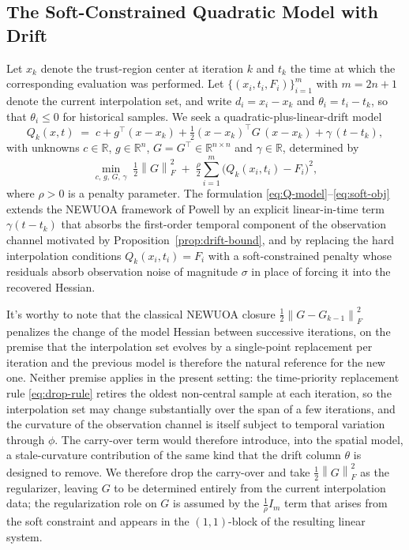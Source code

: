 \documentclass[11pt,a4paper]{article}
\newcommand{\R}{\mathbb{R}}
\newcommand{\norm}[1]{\left\| #1 \right\|}
\begin{document}
\subsection{The Soft-Constrained Quadratic Model with Drift}
\label{sec:kkt-derivation}

Let $x_k$ denote the trust-region center at iteration $k$ and $t_k$
the time at which the corresponding evaluation was performed. Let
$\{(x_i, t_i, F_i)\}_{i=1}^m$ with $m = 2n+1$ denote the current
interpolation set, and write $d_i = x_i - x_k$ and
$\theta_i = t_i - t_k$, so that $\theta_i \le 0$ for historical
samples. We seek a quadratic-plus-linear-drift model
\begin{equation}\label{eq:Q-model}
  Q_k(x,t) \;=\; c + g^{\!\top}(x - x_k) +
  \tfrac{1}{2}(x - x_k)^{\!\top}G\,(x - x_k) + \gamma\,(t - t_k),
\end{equation}
with unknowns $c\in\R$, $g\in\R^n$, $G = G^\top\in\R^{n\times n}$ and
$\gamma\in\R$, determined by
\begin{equation}\label{eq:soft-obj}
  \min_{c,\,g,\,G,\,\gamma}\;
  \tfrac{1}{2}\norm{G}_F^2
  \;+\;
  \tfrac{\rho}{2}\sum_{i=1}^{m}
  \bigl(Q_k(x_i, t_i) - F_i\bigr)^2,
\end{equation}
where $\rho>0$ is a penalty parameter. The formulation
\eqref{eq:Q-model}--\eqref{eq:soft-obj} extends the NEWUOA framework
of Powell \cite{Powell2006NEWUOA} by an explicit linear-in-time term
$\gamma(t - t_k)$ that absorbs the first-order temporal component of
the observation channel motivated by
Proposition~\ref{prop:drift-bound}, and by replacing the hard
interpolation conditions $Q_k(x_i, t_i) = F_i$ with a soft-constrained
penalty whose residuals absorb observation noise of magnitude
$\sigma$ in place of forcing it into the recovered Hessian.

It's worthy to note that the classical NEWUOA closure 
$\tfrac{1}{2}\norm{G - G_{k-1}}_F^2$ penalizes the
change of the model Hessian between successive iterations, on the
premise that the interpolation set evolves by a single-point
replacement per iteration and the previous model is therefore the
natural reference for the new one. Neither premise applies in the
present setting: the time-priority replacement rule
\eqref{eq:drop-rule} retires the oldest non-central sample
at each iteration, so the interpolation set may change substantially
over the span of a few iterations, and the curvature of the
observation channel is itself subject to temporal variation through
$\phi$. The carry-over term would therefore introduce, into the
spatial model, a stale-curvature contribution of the same kind that
the drift column $\theta$ is designed to remove. We therefore drop
the carry-over and take $\tfrac{1}{2}\norm{G}_F^2$ as the
regularizer, leaving $G$ to be determined entirely from the current
interpolation data; the regularization role on $G$ is assumed by the
$\tfrac{1}{\rho}I_m$ term that arises from the soft constraint and
appears in the $(1,1)$-block of the resulting linear system.
\end{document}
